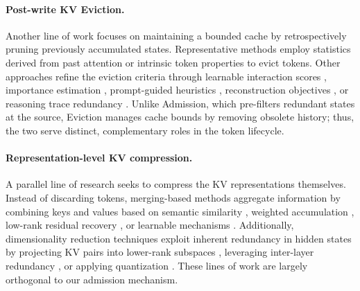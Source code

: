 \paragraph{Post-write KV Eviction.} Another line of work focuses on maintaining a bounded cache by retrospectively pruning previously accumulated states. Representative methods employ statistics derived from past attention \cite{scissorhands,h2o,tova} or intrinsic token properties \cite{sirllm,l2norm,qfilters,expectedattn} to evict tokens. Other approaches refine the eviction criteria through learnable interaction scores \cite{dcp,attngate}, importance estimation \cite{locret,kvzap,kvp,trimkv,fastkvzip}, prompt-guided heuristics \cite{snapkv,nacl,pyramidinfer,finch,andpro}, reconstruction objectives \cite{kvzip}, or reasoning trace redundancy \cite{dms,headkv,rkv}. Unlike Admission, which pre-filters redundant states at the source, Eviction manages cache bounds by removing obsolete history; thus, the two serve distinct, complementary roles in the token lifecycle.

\paragraph{Representation-level KV compression.} A parallel line of research seeks to compress the KV representations themselves. Instead of discarding tokens, merging-based methods aggregate information by combining keys and values based on semantic similarity \cite{kvmerger}, weighted accumulation \cite{cam}, low-rank residual recovery \cite{less}, or learnable mechanisms \cite{dmc,deepseekv4}. Additionally, dimensionality reduction techniques exploit inherent redundancy in hidden states by projecting KV pairs into lower-rank subspaces \cite{eigenattn,shadowkv,palu,think,matryoshkakv}, leveraging inter-layer redundancy \cite{minicache,lckv,cla,xkv}, or applying quantization \cite{kvquant}. These lines of work are largely orthogonal to our admission mechanism.